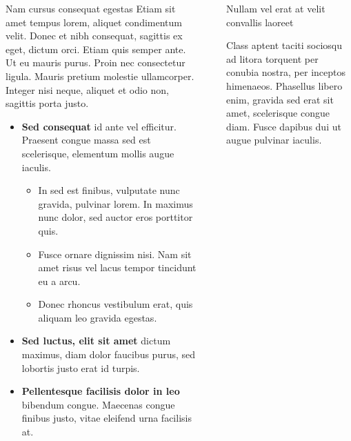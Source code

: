 \documentclass[final]{beamer}
\newlength{\sepwidth}
\newlength{\colwidth}
\newcommand{\separatorcolumn}{\begin{column}{\sepwidth}\end{column}}
\begin{document}
\begin{frame}[t]
\begin{columns}[t]
\begin{column}{\colwidth}
\begin{block}{Nam cursus consequat egestas}
        Etiam sit amet tempus lorem, aliquet condimentum velit. Donec et nibh
        consequat, sagittis ex eget, dictum orci. Etiam quis semper ante. Ut eu
        mauris purus. Proin nec consectetur ligula. Mauris pretium molestie
        ullamcorper. Integer nisi neque, aliquet et odio non, sagittis porta justo.

        \begin{itemize}
          \item \textbf{Sed consequat} id ante vel efficitur. Praesent congue massa
                sed est scelerisque, elementum mollis augue iaculis.
                \begin{itemize}
                  \item In sed est finibus, vulputate
                        nunc gravida, pulvinar lorem. In maximus nunc dolor, sed auctor eros
                        porttitor quis.
                  \item Fusce ornare dignissim nisi. Nam sit amet risus vel lacus
                        tempor tincidunt eu a arcu.
                  \item Donec rhoncus vestibulum erat, quis aliquam leo
                        gravida egestas.
                \end{itemize}
          \item \textbf{Sed luctus, elit sit amet} dictum maximus, diam dolor
                faucibus purus, sed lobortis justo erat id turpis.
          \item \textbf{Pellentesque facilisis dolor in leo} bibendum congue.
                Maecenas congue finibus justo, vitae eleifend urna facilisis at.
        \end{itemize}

      \end{block}

    \end{column}

    \separatorcolumn


    \begin{column}{\colwidth}

      

      \begin{block}{Nullam vel erat at velit convallis laoreet}

        Class aptent taciti sociosqu ad litora torquent per conubia nostra, per
        inceptos himenaeos. Phasellus libero enim, gravida sed erat sit amet,
        scelerisque congue diam. Fusce dapibus dui ut augue pulvinar iaculis.


\end{block}
\end{column}
\end{columns}
\end{frame}
\end{document}
